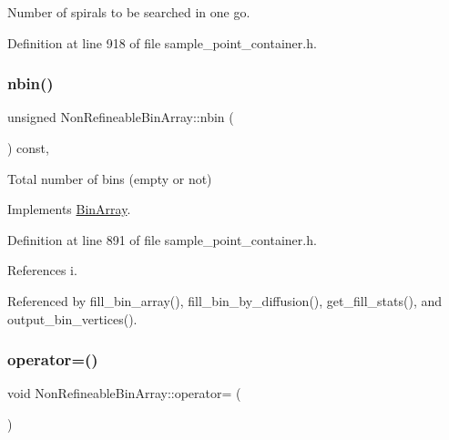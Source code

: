 Number of spirals to be searched in one go. 



Definition at line 918 of file sample\+\_\+point\+\_\+container.\+h.

\mbox{\label{classNonRefineableBinArray_af591a06dbe5bbf379c5a52d7a2f1d611}} 
\subsubsection{\texorpdfstring{nbin()}{nbin()}}
{\footnotesize\ttfamily unsigned Non\+Refineable\+Bin\+Array\+::nbin (\begin{DoxyParamCaption}{ }\end{DoxyParamCaption}) const\hspace{0.3cm}{\ttfamily [inline]}, {\ttfamily [virtual]}}



Total number of bins (empty or not) 



Implements \hyperlink{classBinArray_aad085bf99d78162120c419f7504d256b}{Bin\+Array}.



Definition at line 891 of file sample\+\_\+point\+\_\+container.\+h.



References i.



Referenced by fill\+\_\+bin\+\_\+array(), fill\+\_\+bin\+\_\+by\+\_\+diffusion(), get\+\_\+fill\+\_\+stats(), and output\+\_\+bin\+\_\+vertices().

\mbox{\label{classNonRefineableBinArray_abd5b04d28370d977a6c32fefb9d2e6f1}} 
\subsubsection{\texorpdfstring{operator=()}{operator=()}}
{\footnotesize\ttfamily void Non\+Refineable\+Bin\+Array\+::operator= (\begin{DoxyParamCaption}\item[{const \hyperlink{classNonRefineableBinArray}{Non\+Refineable\+Bin\+Array} \&}]{ }\end{DoxyParamCaption})\hspace{0.3cm}{\ttfamily [inline]}}



